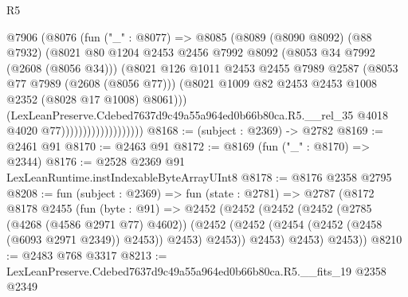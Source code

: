 \begin{lexlean}{R5}
\begin{coremodule}
                                @7906
                                  (@8076
                                    (fun ("_" : @8077) =>
                                    @8085
                                      (@8089
                                        (@8090 @8092)
                                        (@88 @7932)
                                        (@8021
                                          @80
                                          @1204
                                          @2453
                                          @2456
                                          @7992
                                          @8092
                                          (@8053 @34 @7992 (@2608 (@8056 @34)))
                                          (@8021
                                            @126
                                            @1011
                                            @2453
                                            @2455
                                            @7989
                                            @2587
                                            (@8053 @77 @7989 (@2608 (@8056 @77)))
                                            (@8021
                                              @1009
                                              @82
                                              @2453
                                              @2453
                                              @1008
                                              @2352
                                              (@8028 @17 @1008)
                                              @8061)))
                                        (LexLeanPreserve.Cdebed7637d9c49a55a964ed0b66b80ca.R5.__rel_35
                                          @4018
                                          @4020
                                          @77)))))))))))))))))))
@8168 := (subject : @2369) -> @2782
@8169 := @2461 @91
@8170 := @2463 @91
@8172 := @8169 (fun ("_" : @8170) => @2344)
@8176 := @2528 @2369 @91 LexLeanRuntime.instIndexableByteArrayUInt8
@8178 := @8176 @2358 @2795
@8208 := fun (subject : @2369) =>
  fun (state : @2781) =>
  @2787
    (@8172
      @8178
      @2455
      (fun (byte : @91) =>
      @2452
        (@2452
          (@2452
            (@2452
              (@2785 (@4268 (@4586 @2971 @77) @4602))
              (@2452 (@2452 (@2454 (@2452 (@2458 (@6093 @2971 @2349)) @2453)) @2453) @2453))
            @2453)
          @2453)
        @2453))
@8210 := @2483 @768 @3317
@8213 := LexLeanPreserve.Cdebed7637d9c49a55a964ed0b66b80ca.R5.__fits_19 @2358 @2349

\end{coremodule}
\end{lexlean}
